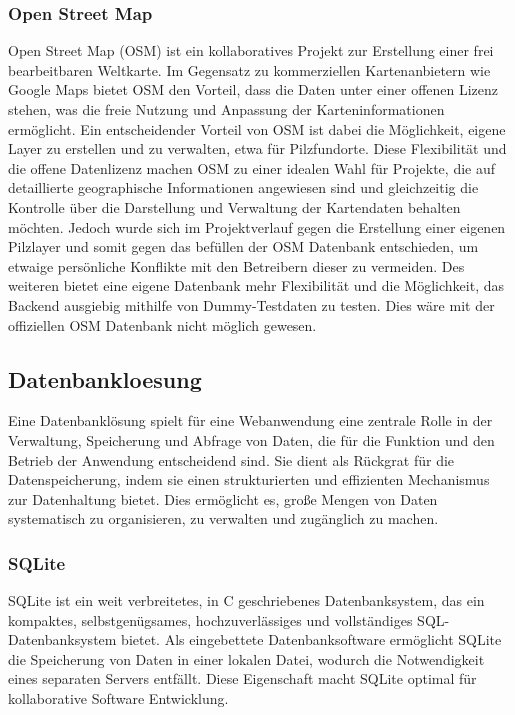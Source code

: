 \subsubsection{Open Street Map}

Open Street Map (OSM) ist ein kollaboratives Projekt zur Erstellung einer frei bearbeitbaren Weltkarte. Im Gegensatz zu kommerziellen
Kartenanbietern wie Google Maps bietet OSM den Vorteil, dass die Daten unter einer offenen Lizenz stehen, was die freie Nutzung und
Anpassung der Karteninformationen ermöglicht. Ein entscheidender Vorteil von OSM ist dabei die Möglichkeit, eigene Layer zu erstellen und
zu verwalten, etwa für Pilzfundorte. Diese Flexibilität und die offene Datenlizenz machen OSM zu einer idealen Wahl für Projekte, die auf
detaillierte geographische Informationen angewiesen sind und gleichzeitig die Kontrolle über die Darstellung und Verwaltung der Kartendaten
behalten möchten. Jedoch wurde sich im Projektverlauf gegen die Erstellung einer eigenen Pilzlayer und somit gegen das befüllen der OSM Datenbank
entschieden, um etwaige persönliche Konflikte mit den Betreibern dieser zu vermeiden. Des weiteren bietet eine eigene Datenbank mehr Flexibilität
und die Möglichkeit, das Backend ausgiebig mithilfe von Dummy-Testdaten zu testen. Dies wäre mit der offiziellen OSM Datenbank nicht möglich gewesen.

\subsection{Datenbankloesung}

Eine Datenbanklösung spielt für eine Webanwendung eine zentrale Rolle in der Verwaltung, Speicherung und Abfrage von Daten, die für die Funktion und
den Betrieb der Anwendung entscheidend sind. Sie dient als Rückgrat für die Datenspeicherung, indem sie einen strukturierten und effizienten Mechanismus
zur Datenhaltung bietet. Dies ermöglicht es, große Mengen von Daten systematisch zu organisieren, zu verwalten und zugänglich zu machen.

\subsubsection{SQLite}

SQLite ist ein weit verbreitetes, in C geschriebenes Datenbanksystem, das ein kompaktes, selbstgenügsames, hochzuverlässiges und vollständiges SQL-Datenbanksystem
bietet. Als eingebettete Datenbanksoftware ermöglicht SQLite die Speicherung von Daten in einer lokalen Datei, wodurch die Notwendigkeit eines separaten Servers
entfällt. Diese Eigenschaft macht SQLite optimal für kollaborative Software Entwicklung.

